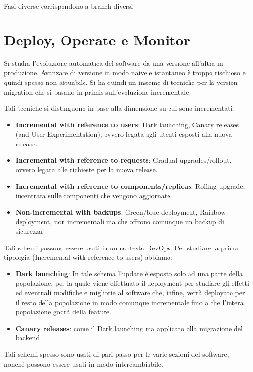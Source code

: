 Fasi diverse corrispondono a branch diversi
\section{Deploy, Operate e Monitor}
Si studia l'evoluzione automatica del software da una versione all'altra in
produzione. Avanzare di versione in modo naive e istantaneo è troppo rischioso e
quindi spesso non attuabile. Si ha quindi un insieme di tecniche per la version
migration che si basano in primis sull'evoluzione incrementale.

Tali tecniche si distinguono in base alla dimensione su cui sono incrementati:
\begin{itemize}
      \item \textbf{Incremental with reference to users}: Dark launching, Canary
            releases (and User Experimentation), ovvero legata agli utenti esposti
            alla nuova release.
      \item \textbf{Incremental with reference to requests}: Gradual upgrades/rollout,
            ovvero legata alle richieste per la nuova release.
      \item \textbf{Incremental with reference to components/replicas}: Rolling
            upgrade, incentrata sulle componenti che vengono aggiornate.
      \item \textbf{Non-incremental with backups}: Green/blue deployment,
            Rainbow deployment, non incrementali ma che offrono comunque un backup
            di sicurezza.
\end{itemize}
Tali schemi possono essere usati in un contesto DevOps. Per studiare la prima
tipologia (Incremental with reference to users) abbiamo:
\begin{itemize}
    \item \textbf{Dark launching}: In tale schema l'update è esposto solo ad una
          parte della popolazione, per la quale viene effettuato il deployment per
          studiare gli effetti ed eventuali modifiche e migliorie al software che, infine,
          verrà deployato per il resto della popolazione in modo comunque incrementale
          fino a che l'intera popolazione godrà della feature.
    \item \textbf{Canary releases}: come il Dark launching ma applicato alla migrazione del
          backend 
\end{itemize}

Tali schemi spesso sono usati di pari passo per le varie sezioni del software,
nonché possono essere usati in modo intercambiabile.

